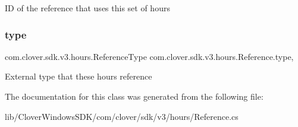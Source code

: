 ID of the reference that uses this set of hours 

\mbox{\label{classcom_1_1clover_1_1sdk_1_1v3_1_1hours_1_1_reference_ad2681c4206e183b6b2415b93ca2278d7}} 
\subsubsection{\texorpdfstring{type}{type}}
{\footnotesize\ttfamily com.\+clover.\+sdk.\+v3.\+hours.\+Reference\+Type com.\+clover.\+sdk.\+v3.\+hours.\+Reference.\+type\hspace{0.3cm}{\ttfamily [get]}, {\ttfamily [set]}}



External type that these hours reference 



The documentation for this class was generated from the following file\+:\begin{DoxyCompactItemize}
\item 
lib/\+Clover\+Windows\+S\+D\+K/com/clover/sdk/v3/hours/Reference.\+cs\end{DoxyCompactItemize}
